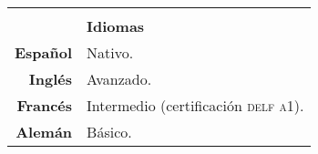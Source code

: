 \documentclass[12pt,a4paper]{article}
\begin{document}
\begin{longtable}[t]{r p{12cm}}

  & \\
  & \textbf{Idiomas} \\
 \cline{2-2}
 \textbf{Español} & Nativo. \\
 \textbf{Inglés}  & Avanzado. \\
 \textbf{Francés} & Intermedio (certificación \textsc{delf a1}). \\
 \textbf{Alemán}  & Básico. \\


\end{longtable}
\end{document}
